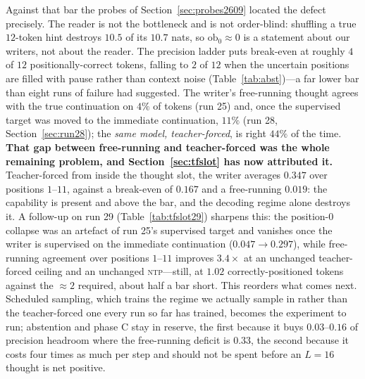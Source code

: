 \documentclass{article} %
\begin{document}
Against that bar the probes of Section~\ref{sec:probes2609} located the defect precisely. The reader is not the bottleneck and is not order-blind: shuffling a true $12$-token hint destroys $10.5$ of its $10.7$ nats, so $\mathrm{ob}_0 \approx 0$ is a statement about our writers, not about the reader. The precision ladder puts break-even at roughly $4$ of $12$ positionally-correct tokens, falling to $2$ of $12$ when the uncertain positions are filled with pause rather than context noise (Table~\ref{tab:abst})---a far lower bar than eight runs of failure had suggested. The writer's free-running thought agrees with the true continuation on $4\%$ of tokens (run 25) and, once the supervised target was moved to the immediate continuation, $11\%$ (run 28, Section~\ref{sec:run28}); the \emph{same model, teacher-forced}, is right $44\%$ of the time. \textbf{That gap between free-running and teacher-forced was the whole remaining problem, and Section~\ref{sec:tfslot} has now attributed it.} Teacher-forced from inside the thought slot, the writer averages $0.347$ over positions $1$--$11$, against a break-even of $0.167$ and a free-running $0.019$: the capability is present and above the bar, and the decoding regime alone destroys it. A follow-up on run 29 (Table~\ref{tab:tfslot29}) sharpens this: the position-$0$ collapse was an artefact of run 25's supervised target and vanishes once the writer is supervised on the immediate continuation ($0.047 \to 0.297$), while free-running agreement over positions $1$--$11$ improves $3.4\times$ at an unchanged teacher-forced ceiling and an unchanged \textsc{ntp}---still, at $1.02$ correctly-positioned tokens against the $\approx 2$ required, about half a bar short. This reorders what comes next. Scheduled sampling, which trains the regime we actually sample in rather than the teacher-forced one every run so far has trained, becomes the experiment to run; abstention and phase C stay in reserve, the first because it buys $0.03$--$0.16$ of precision headroom where the free-running deficit is $0.33$, the second because it costs four times as much per step and should not be spent before an $L{=}16$ thought is net positive.
\end{document}
